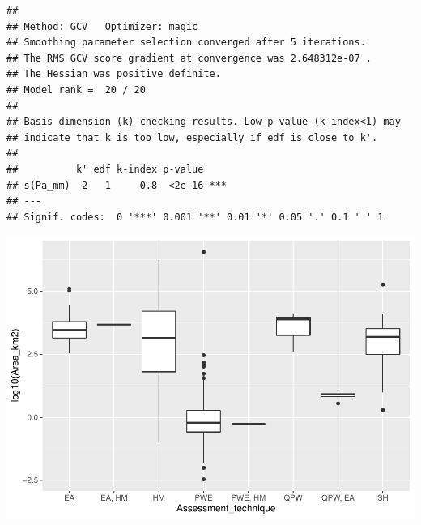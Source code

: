 \documentclass[]{elsarticle} %
\newenvironment{Shaded}{\begin{snugshade}}{\end{snugshade}}
\newcommand{\DataTypeTok}[1]{\textcolor[rgb]{0.13,0.29,0.53}{#1}}
\newcommand{\DecValTok}[1]{\textcolor[rgb]{0.00,0.00,0.81}{#1}}
\newcommand{\KeywordTok}[1]{\textcolor[rgb]{0.13,0.29,0.53}{\textbf{#1}}}
\newcommand{\NormalTok}[1]{#1}
\newcommand{\OperatorTok}[1]{\textcolor[rgb]{0.81,0.36,0.00}{\textbf{#1}}}
\newcommand{\StringTok}[1]{\textcolor[rgb]{0.31,0.60,0.02}{#1}}
\begin{document}
\begin{verbatim}
## 
## Method: GCV   Optimizer: magic
## Smoothing parameter selection converged after 5 iterations.
## The RMS GCV score gradient at convergence was 2.648312e-07 .
## The Hessian was positive definite.
## Model rank =  20 / 20 
## 
## Basis dimension (k) checking results. Low p-value (k-index<1) may
## indicate that k is too low, especially if edf is close to k'.
## 
##          k' edf k-index p-value    
## s(Pa_mm)  2   1     0.8  <2e-16 ***
## ---
## Signif. codes:  0 '***' 0.001 '**' 0.01 '*' 0.05 '.' 0.1 ' ' 1
\end{verbatim}

\begin{Shaded}
\end{Shaded}

\includegraphics{Forest_and_Water_files/figure-latex/unnamed-chunk-4-1.pdf}

\begin{Shaded}
\end{Shaded}
\end{document}
